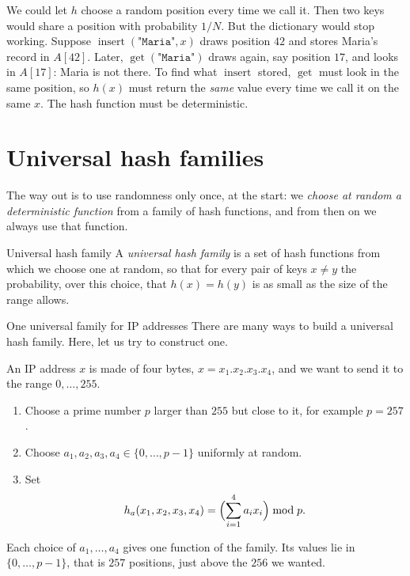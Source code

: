\documentclass[a4paper,12pt,oneside]{report}
\begin{document}
We could let $h$ choose a random position every time we call it.
Then two keys would share a position with probability $1/N$. But the
dictionary would stop working. Suppose
$\operatorname{insert}(\texttt{"Maria"},x)$ draws position $42$ and
stores Maria's record in $A[42]$. Later,
$\operatorname{get}(\texttt{"Maria"})$ draws again, say position
$17$, and looks in $A[17]$: Maria is not there. To find what
$\operatorname{insert}$ stored, $\operatorname{get}$ must look in the
same position, so $h(x)$ must return the \emph{same} value every
time we call it on the same $x$. The hash function must be
deterministic.

\section{Universal hash families}

The way out is to use randomness only once, at the start: we
\emph{choose at random a deterministic function} from a family of
hash functions, and from then on we always use that function.

\begin{frameddefn}{Universal hash family}\label{def:universal-hash-family}
A \emph{universal hash family} is a set of hash functions from
which we choose one at random, so that for every pair of keys
$x\neq y$ the probability, over this choice, that $h(x)=h(y)$ is
as small as the size of the range allows.
\end{frameddefn}

\begin{framedexample}{One universal family for IP addresses}
There are many ways to build a universal hash family. Here, let us
try to construct one.

An IP address $x$ is made of four bytes, $x=x_1.x_2.x_3.x_4$, and
we want to send it to the range $0,\ldots,255$.
\begin{enumerate}
  \item Choose a prime number $p$ larger than $255$ but close to it,
    for example $p=257$.
  \item Choose $a_1,a_2,a_3,a_4\in\{0,\ldots,p-1\}$ uniformly at
    random.
  \item Set
    \[
      h_{a}(x_1,x_2,x_3,x_4)=\Bigl(\sum_{i=1}^{4}a_i x_i\Bigr)\bmod p.
    \]
\end{enumerate}
Each choice of $a_1,\ldots,a_4$ gives one function of the family.
Its values lie in $\{0,\ldots,p-1\}$, that is $257$ positions, just
above the $256$ we wanted.
\end{framedexample}
\end{document}
